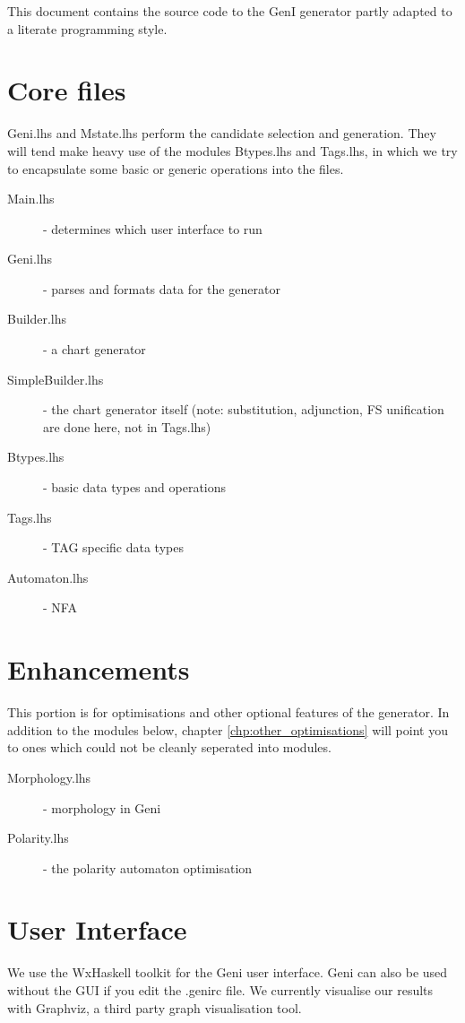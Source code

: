 \documentclass[a4paper,11pt]{report}
\begin{document}
This document contains the source code to the GenI generator 
partly adapted to a literate programming style.  

\section{Core files}

Geni.lhs and Mstate.lhs perform the candidate selection and generation.
They will tend make heavy use of the modules Btypes.lhs and Tags.lhs, in
which we try to encapsulate some basic or generic operations into the
files.

\begin{description}
 \item[Main.lhs] - determines which user interface to run 
 \item[Geni.lhs] - parses and formats data for the generator 
 \item[Builder.lhs] - a chart generator   
 \item[SimpleBuilder.lhs] - the chart generator itself (note: substitution,
 adjunction, FS unification are done here, not in Tags.lhs)
 \item[Btypes.lhs] - basic data types and operations
 \item[Tags.lhs] - TAG specific data types
 \item[Automaton.lhs] - NFA  
\end{description}

\section{Enhancements}

This portion is for optimisations and other optional features of the
generator.
In addition to the modules below, chapter \ref{chp:other_optimisations}
will point you to ones which could not be cleanly seperated into
modules.

\begin{description}
 \item[Morphology.lhs] - morphology in Geni  
 \item[Polarity.lhs]   - the polarity automaton optimisation 
\end{description}

\section{User Interface}

We use the WxHaskell toolkit for the Geni user interface.  Geni
can also be used without the GUI if you edit the .genirc file.
We currently visualise our results with Graphviz, a third party graph
visualisation tool.
\end{document}
